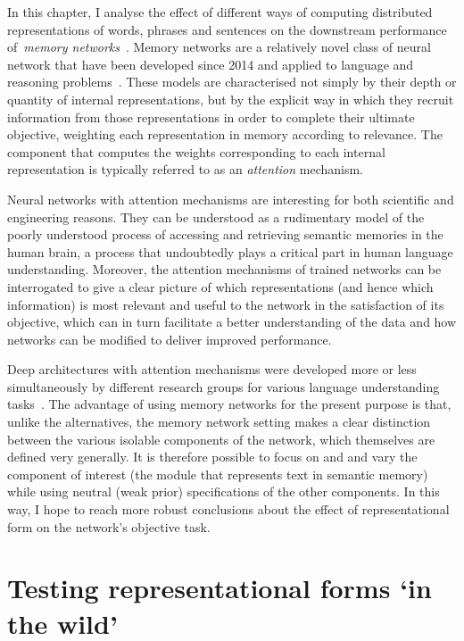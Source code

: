 \label{CH6}

In this chapter, I analyse the effect of different ways of computing distributed representations of words, phrases and sentences on the downstream performance of~\emph{memory networks}~\citep{weston2014memory}. Memory networks are a relatively novel class of neural network that have been developed since 2014 and applied to language and reasoning problems~\citep{weston2015towards}. These models are characterised not simply by their depth or quantity of internal representations, but by the explicit way in which they recruit information from those representations in order to complete their ultimate objective, weighting each representation in memory according to relevance. The component that computes the weights corresponding to each internal representation is typically referred to as an \emph{attention} mechanism. 

Neural networks with attention mechanisms are interesting for both scientific and engineering reasons. They can be understood as a rudimentary model of the poorly understood process of accessing and retrieving semantic memories in the human brain, a process that undoubtedly plays a critical part in human language understanding. Moreover, the attention mechanisms of trained networks can be interrogated to give a clear picture of which representations (and hence which information) is most relevant and useful to the network in the satisfaction of its objective, which can in turn facilitate a better understanding of the data and how networks can be modified to deliver improved performance.  

Deep architectures with attention mechanisms were developed more or less simultaneously by different research groups for various language understanding tasks~\citep{bahdanau2014neural,nips15_hermann}. The advantage of using memory networks for the present purpose is that, unlike the alternatives, the memory network setting makes a clear distinction between the various isolable components of the network, which themselves are defined very generally. It is therefore possible to focus on and and vary the component of interest (the module that represents text in semantic memory) while using neutral (weak prior) specifications of the other components. In this way, I hope to reach more robust conclusions about the effect of representational form on the network's objective task.  

\section{Testing representational forms `in the wild'}

